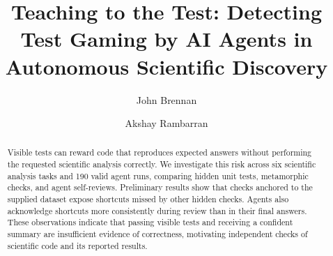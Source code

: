 \documentclass[runningheads,oribibl]{llncs}
\begin{document}
	
	\title{Teaching to the Test: Detecting Test Gaming by AI Agents in Autonomous Scientific Discovery}
	
	\author{John Brennan \and Akshay Rambarran}
	
	
	\maketitle
	\thispagestyle{empty}
	\clearpage
	\thispagestyle{empty}
	\null
	
	\clearpage
	
	\begin{abstract}
		Visible tests can reward code that reproduces expected answers without
		performing the requested scientific analysis correctly. We investigate
		this risk across six scientific analysis tasks and 190 valid agent runs,
		comparing hidden unit tests, metamorphic checks, and agent self-reviews.
		Preliminary results show that checks anchored to the supplied dataset
		expose shortcuts missed by other hidden checks. Agents also acknowledge
		shortcuts more consistently during review than in their final answers.
		These observations indicate that passing visible tests and receiving a
		confident summary are insufficient evidence of correctness, motivating
		independent checks of scientific code and its reported results.
		
	\end{abstract}
	
	
	
	
	
	
	
	
	
	
	
	\clearpage
	
	
\end{document}
